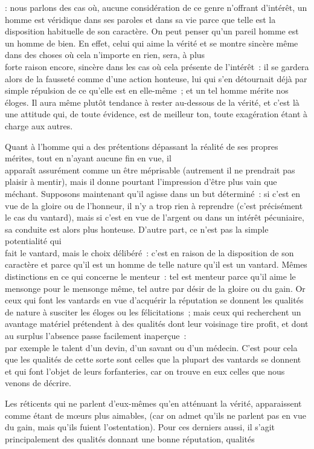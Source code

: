 \documentclass[french,twoside]{book} %
\begin{document}
: nous parlons des cas où, aucune considération de ce genre n’offrant d’intérêt, un homme est véridique dans ses paroles et dans sa vie parce que telle est la disposition habituelle de son caractère. On peut penser qu’un pareil homme est un homme de bien. En effet, celui qui aime la vérité et se montre sincère même dans des choses où cela n’importe en rien, sera, à plus \\
forte raison encore, sincère dans les cas où cela présente de l’intérêt : il se gardera alors de la fausseté comme d’une action honteuse, lui qui s’en détournait déjà par simple répulsion de ce qu’elle est en elle-même ; et un tel homme mérite nos éloges. Il aura même plutôt tendance à rester au-dessous de la vérité, et c’est là une attitude qui, de toute évidence, est de meilleur ton, toute exagération étant à charge aux autres.\par
Quant à l’homme qui a des prétentions dépassant la réalité de ses propres mérites, tout en n’ayant aucune fin en vue, il \\
apparaît assurément comme un être méprisable (autrement il ne prendrait pas plaisir à mentir), mais il donne pourtant l’impression d’être plus vain que méchant. Supposons maintenant qu’il agisse dans un but déterminé : si c’est en vue de la gloire ou de l’honneur, il n’y a trop rien à reprendre (c’est précisément le cas du vantard), mais si c’est en vue de l’argent ou dans un intérêt pécuniaire, sa conduite est alors plus honteuse. D’autre part, ce n’est pas la simple potentialité qui \\
fait le vantard, mais le choix délibéré : c’est en raison de la disposition de son caractère et parce qu’il est un homme de telle nature qu’il est un vantard. Mêmes distinctions en ce qui concerne le menteur : tel est menteur parce qu’il aime le mensonge pour le mensonge même, tel autre par désir de la gloire ou du gain. Or ceux qui font les vantards en vue d’acquérir la réputation se donnent les qualités de nature à susciter les éloges ou les félicitations ; mais ceux qui recherchent un avantage matériel prétendent à des qualités dont leur voisinage tire profit, et dont au surplus l’absence passe facilement inaperçue : \\
par exemple le talent d’un devin, d’un savant ou d’un médecin. C’est pour cela que les qualités de cette sorte sont celles que la plupart des vantards se donnent et qui font l’objet de leurs forfanteries, car on trouve en eux celles que nous venons de décrire.\par
Les réticents qui ne parlent d’eux-mêmes qu’en atténuant la vérité, apparaissent comme étant de mœurs plus aimables, (car on admet qu’ils ne parlent pas en vue du gain, mais qu’ils fuient l’ostentation). Pour ces derniers aussi, il s’agit principalement des qualités donnant une bonne réputation, qualités \\
\end{document}
